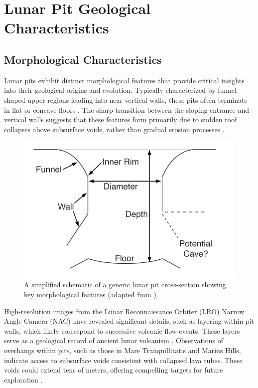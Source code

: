 \graphicspath{{img/ch2}}

\section{Lunar Pit Geological Characteristics}

\subsection{Morphological Characteristics}

Lunar pits exhibit distinct morphological features that provide critical insights into their geological origins and evolution. Typically characterized by funnel-shaped upper regions leading into near-vertical walls, these pits often terminate in flat or concave floors \cite{new-wagner, lunar-pits-numerical-modelling, lunar-pit-distribution}. The sharp transition between the sloping entrance and vertical walls suggests that these features form primarily due to sudden roof collapses above subsurface voids, rather than gradual erosion processes \cite{lunar-pits-numerical-modelling, new-wagner}.

\begin{figure}[h!]
    \centering
    \includegraphics[width=0.5\linewidth]{lunar_pit_schema.png}
    \caption{A simplified schematic of a generic lunar pit cross-section showing key morphological features (adapted from \cite{new-wagner}).}
    \label{fig:lunar-pit-schema}
\end{figure}

High-resolution images from the Lunar Reconnaissance Orbiter (LRO) Narrow Angle Camera (NAC) have revealed significant details, such as layering within pit walls, which likely correspond to successive volcanic flow events. These layers serve as a geological record of ancient lunar volcanism \cite{new-wagner, lunar-pit-distribution}. Observations of overhangs within pits, such as those in Mare Tranquillitatis and Marius Hills, indicate access to subsurface voids consistent with collapsed lava tubes. These voids could extend tens of meters, offering compelling targets for future exploration \cite{lunar-pits-entrances-to-caves, Carrer2024}.

